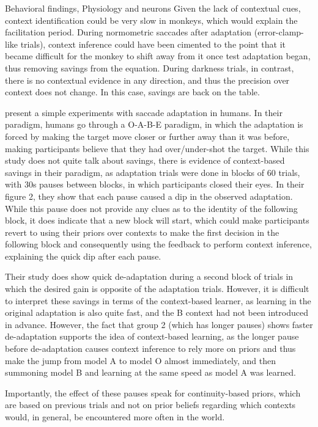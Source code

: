 \documentclass{report}
\begin{document}
\begin{chapter}{Behavioral findings, Physiology and neurons}
Given the lack of contextual cues, context identification could be very slow in
monkeys, which would explain the facilitation period. During normometric
saccades after adaptation (error-clamp-like trials), context inference could
have been cimented to the point that it became difficult for the monkey to
shift away from it once test adaptation began, thus removing savings from the
equation. During darkness trials, in contrast, there is no contextual evidence
in any direction, and thus the precision over context does not change. In this
case, savings are back on the table.

\cite{Ethier_Spontaneous_2008} present a simple experiments with saccade
adaptation in humans. In their paradigm, humans go through a O-A-B-E paradigm,
in which the adaptation is forced by making the target move closer or further
away than it was before, making participants believe that they had
over/under-shot the target. While this study does not quite talk about savings,
there is evidence of context-based savings in their paradigm, as adaptation
trials were done in blocks of 60 trials, with 30s pauses between blocks, in
which participants closed their eyes. In their figure 2, they show that each
pause caused a dip in the observed adaptation. While this pause does not
provide any clues as to the identity of the following block, it does indicate
that a new block will start, which could make participants revert to using
their priors over contexts to make the first decision in the following block
and consequently using the feedback to perform context inference, explaining
the quick dip after each pause.

Their study does show quick de-adaptation during a second block of trials in
which the desired gain is opposite of the adaptation trials. However, it is
difficult to interpret these savings in terms of the context-based learner, as
learning in the original adaptation is also quite fast, and the B context had
not been introduced in advance. However, the fact that group 2 (which has
longer pauses) shows faster de-adaptation supports the idea of context-based
learning, as the longer pause before de-adaptation causes context inference to
rely more on priors and thus make the jump from model A to model O almost
immediately, and then summoning model B and learning at the same speed as model
A was learned.

Importantly, the effect of these pauses speak for continuity-based priors,
which are based on previous trials and not on prior beliefs regarding which
contexts would, in general, be encountered more often in the world.


\end{chapter}
\end{document}
